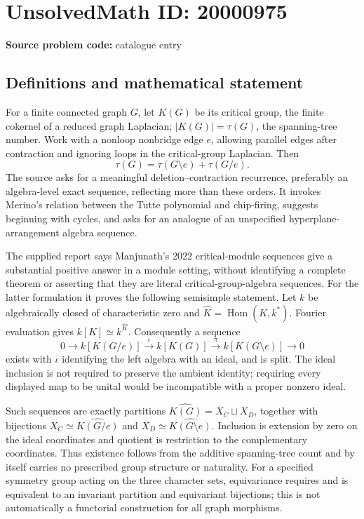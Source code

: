\documentclass[11pt]{article}
\begin{document}
\section*{UnsolvedMath ID: 20000975}
\textbf{Source problem code:} catalogue entry
\subsection{Definitions and mathematical statement}
For a finite connected graph \(G\), let \(K(G)\) be its critical group, the finite cokernel of a reduced graph Laplacian; \(|K(G)|=\tau(G)\), the spanning-tree number. Work with a nonloop nonbridge edge \(e\), allowing parallel edges after contraction and ignoring loops in the critical-group Laplacian. Then
\[
 \tau(G)=\tau(G\setminus e)+\tau(G/e).
\]
The source asks for a meaningful deletion--contraction recurrence, preferably an algebra-level exact sequence, reflecting more than these orders. It invokes Merino's relation between the Tutte polynomial and chip-firing, suggests beginning with cycles, and asks for an analogue of an unspecified hyperplane-arrangement algebra sequence.

The supplied report says Manjunath's 2022 critical-module sequences give a substantial positive answer in a module setting, without identifying a complete theorem or asserting that they are literal critical-group-algebra sequences. For the latter formulation it proves the following semisimple statement. Let \(k\) be algebraically closed of characteristic zero and \(\widehat K=\operatorname{Hom}(K,k^*)\). Fourier evaluation gives \(k[K]\simeq k^{\widehat K}\). Consequently a sequence
\[
 0\longrightarrow k[K(G/e)]\xrightarrow{\iota}k[K(G)]
 \xrightarrow{\pi}k[K(G\setminus e)]\longrightarrow0
\]
exists with \(\iota\) identifying the left algebra with an ideal, and is split. The ideal inclusion is not required to preserve the ambient identity; requiring every displayed map to be unital would be incompatible with a proper nonzero ideal.

Such sequences are exactly partitions
\(\widehat{K(G)}=X_C\sqcup X_D\), together with bijections \(X_C\simeq\widehat{K(G/e)}\) and \(X_D\simeq\widehat{K(G\setminus e)}\). Inclusion is extension by zero on the ideal coordinates and quotient is restriction to the complementary coordinates. Thus existence follows from the additive spanning-tree count and by itself carries no prescribed group structure or naturality. For a specified symmetry group acting on the three character sets, equivariance requires and is equivalent to an invariant partition and equivariant bijections; this is not automatically a functorial construction for all graph morphisms.
\end{document}
